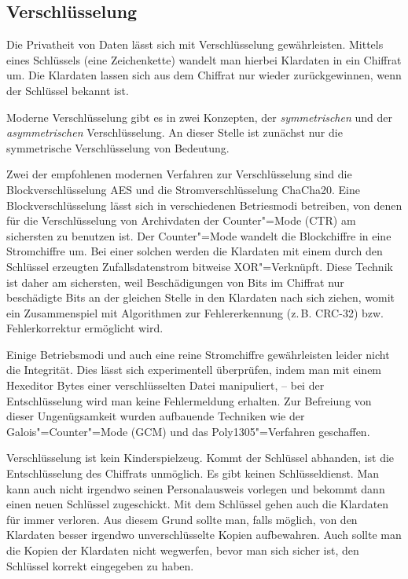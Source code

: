 \documentclass[a4paper,11pt,fleqn,twocolumn,twoside]{scrartcl}
\begin{document}
\subsection{Verschlüsselung}

Die Privatheit von Daten lässt sich mit Verschlüsselung
gewährleisten. Mittels eines Schlüssels (eine Zeichenkette)
wandelt man hierbei Klardaten in ein Chiffrat um. Die Klardaten lassen
sich aus dem Chiffrat nur wieder zurückgewinnen, wenn der Schlüssel
bekannt ist.

Moderne Verschlüsselung gibt es in zwei Konzepten, der
\emph{symmetrischen} und der \emph{asymmetrischen} Verschlüsselung.
An dieser Stelle ist zunächst nur die symmetrische Verschlüsselung
von Bedeutung.

Zwei der empfohlenen modernen Verfahren zur Verschlüsselung
sind die Blockverschlüsselung AES und die Stromverschlüsselung
ChaCha20. Eine Blockverschlüsselung lässt sich in verschiedenen
Betriesmodi betreiben, von denen für die Verschlüsselung von Archivdaten
der Counter"=Mode (CTR) am sichersten zu benutzen ist. Der
Counter"=Mode wandelt die Blockchiffre in eine Stromchiffre um.
Bei einer solchen werden die Klardaten mit einem durch den Schlüssel
erzeugten Zufallsdatenstrom bitweise XOR"=Verknüpft. Diese Technik ist
daher am sichersten, weil Beschädigungen von Bits im Chiffrat nur
beschädigte Bits an der gleichen Stelle in den Klardaten nach sich
ziehen, womit ein Zusammenspiel mit Algorithmen zur Fehlererkennung
(z.\,B. CRC-32) bzw. Fehlerkorrektur ermöglicht wird.

Einige Betriebsmodi und auch eine reine Stromchiffre gewährleisten
leider nicht die Integrität. Dies lässt sich experimentell überprüfen,
indem man mit einem Hexeditor Bytes einer verschlüsselten Datei
manipuliert, -- bei der Entschlüsselung wird man keine Fehlermeldung
erhalten. Zur Befreiung von dieser Ungenügsamkeit wurden
aufbauende Techniken wie der Galois"=Counter"=Mode (GCM)
und das Poly1305"=Verfahren geschaffen.

Verschlüsselung ist kein Kinderspielzeug. Kommt der Schlüssel
abhanden, ist die Entschlüsselung des Chiffrats unmöglich.
Es gibt keinen Schlüsseldienst. Man kann auch nicht irgendwo
seinen Personalausweis vorlegen und bekommt dann einen neuen
Schlüssel zugeschickt. Mit dem Schlüssel gehen auch die Klardaten
für immer verloren. Aus diesem Grund sollte man, falls möglich, von
den Klardaten besser irgendwo unverschlüsselte Kopien aufbewahren.
Auch sollte man die Kopien der Klardaten nicht wegwerfen, bevor man
sich sicher ist, den Schlüssel korrekt eingegeben zu haben.
\end{document}

